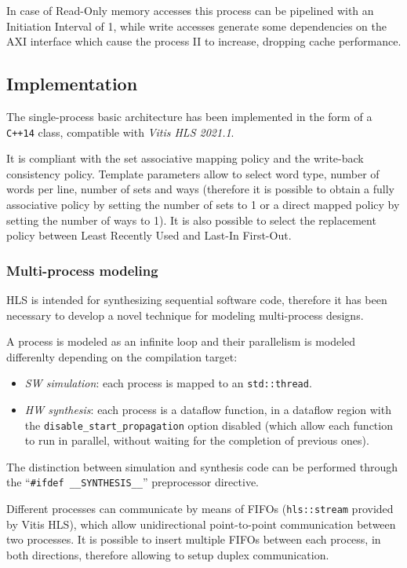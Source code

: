 \documentclass[11pt,a4paper]{memoir}
\begin{document}
In case of Read-Only memory accesses this process can be pipelined with an
Initiation Interval of 1, while write accesses generate some dependencies on the
AXI interface which cause the process II to increase, dropping cache
performance.

\subsection{Implementation}
The single-process basic architecture has been implemented in the form of a
\texttt{C++14} class, compatible with \emph{Vitis HLS 2021.1}.

It is compliant with the set associative mapping policy and the write-back
consistency policy.
Template parameters allow to select word type, number of words per line, number
of sets and ways (therefore it is possible to obtain a fully associative policy
by setting the number of sets to 1 or a direct mapped policy by setting the
number of ways to 1).
It is also possible to select the replacement policy between Least Recently Used
and Last-In First-Out.

\subsubsection{Multi-process modeling}
HLS is intended for synthesizing sequential software code, therefore it has
been necessary to develop a novel technique for modeling multi-process designs.

A process is modeled as an infinite loop and their parallelism is modeled
differenlty depending on the compilation target:
\begin{itemize}
	\item \emph{SW simulation}: each process is mapped to an
		\texttt{std::thread}.
	\item \emph{HW synthesis}: each process is a dataflow function, in a
		dataflow region with the \texttt{disable\_start\_propagation}
		option disabled (which allow each function to run in parallel,
		without waiting for the completion of previous ones).
\end{itemize}
The distinction between simulation and synthesis code can be performed through
the ``\texttt{\#ifdef \_\_SYNTHESIS\_\_}'' preprocessor directive.

Different processes can communicate by means of FIFOs (\texttt{hls::stream}
provided by Vitis HLS), which allow unidirectional point-to-point communication
between two processes. It is possible to insert multiple FIFOs between each
process, in both directions, therefore allowing to setup duplex communication.
\end{document}
